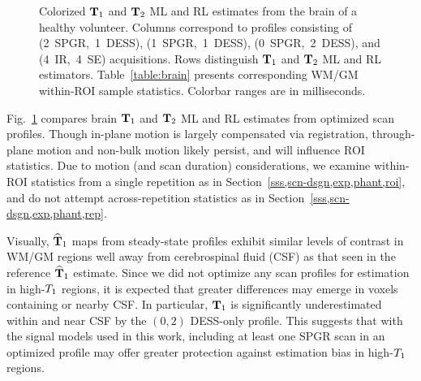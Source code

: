 \begin{figure*} [!tbp]
	\centering
	\vspace{0cm}
	\caption{
		Colorized $\mathbf{T}_1$ and $\mathbf{T}_2$ ML and RL estimates 
		from the brain of a healthy volunteer.
		Columns correspond to profiles consisting 
		of (2~SPGR,~1~DESS), (1~SPGR,~1~DESS), (0~SPGR,~2~DESS), 
		and (4~IR,~4~SE) acquisitions.  
		Rows distinguish $\mathbf{T}_1$ and $\mathbf{T}_2$ ML and RL estimators.
		Table~\ref{table:brain} presents corresponding WM/GM 
		within-ROI sample statistics.
		Colorbar ranges are in milliseconds.
	}
	\label{fig:brain,jet}
\end{figure*}

Fig.~\ref{fig:brain,jet} compares 
brain $\mathbf{T}_1$ and $\mathbf{T}_2$ ML and RL estimates 
from optimized scan profiles.
Though in-plane motion is largely compensated via registration, 
through-plane motion and non-bulk motion likely persist, 
and will influence ROI statistics.
Due to motion (and scan duration) considerations,
we examine within-ROI statistics from a single repetition 
as in Section~\ref{sss,scn-dsgn,exp,phant,roi}, 
and do not attempt across-repetition statistics 
as in Section~\ref{sss,scn-dsgn,exp,phant,rep}.
	
Visually, $\widehat{\mathbf{T}}_1$ maps from steady-state profiles 
exhibit similar levels of contrast 
in WM/GM regions well away 
from cerebrospinal fluid (CSF) as that seen 
in the reference $\widehat{\mathbf{T}}_1$ estimate.
Since we did not optimize any scan profiles 
for estimation in high-$T_1$ regions, 
it is expected that greater differences may emerge 
in voxels containing or nearby CSF. 
In particular, 
$\mathbf{T}_1$ is significantly underestimated 
within and near CSF by the $(0,2)$ DESS-only profile. 
This suggests that with the signal models used in this work, 
including at least one SPGR scan in an optimized profile 
may offer greater protection 
against estimation bias in high-$T_1$ regions.

